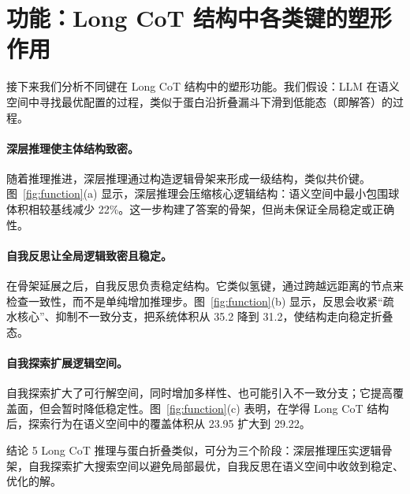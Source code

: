 \section{功能：Long CoT 结构中各类键的塑形作用}
接下来我们分析不同键在 Long CoT 结构中的塑形功能。我们假设：LLM 在语义空间中寻找最优配置的过程，类似于蛋白沿折叠漏斗下滑到低能态（即解答）的过程。\vspace{-8pt}


\paragraph{\textbf{深层推理使主体结构致密。}} 随着推理推进，深层推理通过构造逻辑骨架来形成一级结构，类似共价键。图~\ref{fig:function}(a) 显示，深层推理会压缩核心逻辑结构：语义空间中最小包围球体积相较基线减少 22\%。这一步构建了答案的骨架，但尚未保证全局稳定或正确性。\vspace{-8pt}

\paragraph{\textbf{自我反思让全局逻辑致密且稳定。}} 在骨架延展之后，自我反思负责稳定结构。它类似氢键，通过跨越远距离的节点来检查一致性，而不是单纯增加推理步。图~\ref{fig:function}(b) 显示，反思会收紧“疏水核心”、抑制不一致分支，把系统体积从 35.2 降到 31.2，使结构走向稳定折叠态。\vspace{-8pt}

\paragraph{\textbf{自我探索扩展逻辑空间。}} 自我探索扩大了可行解空间，同时增加多样性、也可能引入不一致分支；它提高覆盖面，但会暂时降低稳定性。图~\ref{fig:function}(c) 表明，在学得 Long CoT 结构后，探索行为在语义空间中的覆盖体积从 23.95 扩大到 29.22。


\begin{TakeawayBox}{结论 5}
Long CoT 推理与蛋白折叠类似，可分为三个阶段：深层推理压实逻辑骨架，自我探索扩大搜索空间以避免局部最优，自我反思在语义空间中收敛到稳定、优化的解。
\end{TakeawayBox}
